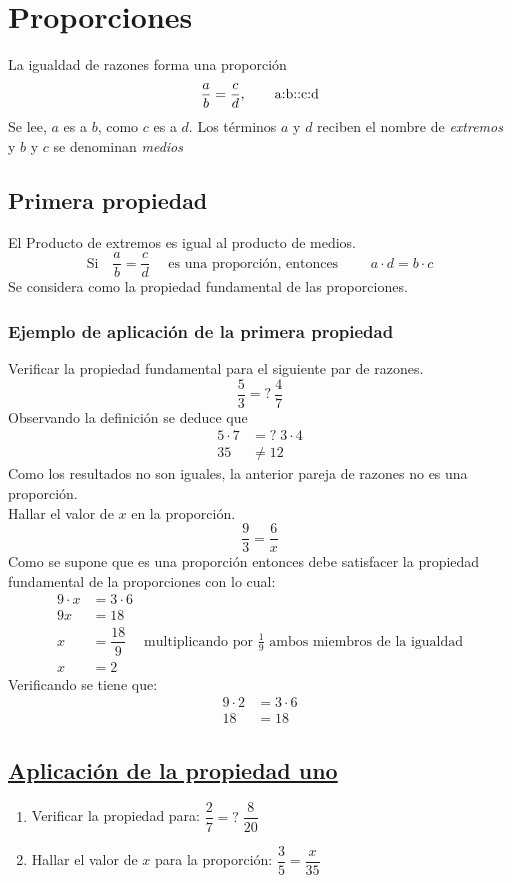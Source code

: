 \documentclass[10pt,twoside]{article}
\begin{document}
\section*{Proporciones}
La igualdad de razones forma una proporción
\[\dfrac{a}{b}=\dfrac{c}{d}, \text{\qquad a:b::c:d}\]
Se lee, $a$ es a $b$, como $c$ es a $d$. Los términos $a$ y $d$ reciben el nombre de \emph{extremos} y $b$ y $c$ se denominan \emph{medios}
\subsection*{Primera propiedad}
El Producto de extremos es igual al producto de medios.
\[\text{Si} \quad \dfrac{a}{b}=\dfrac{c}{d}\quad \text{ es una proporción, entonces }\qquad a\cdot d=b\cdot c\]
Se considera como la propiedad fundamental de las proporciones.
\subsubsection*{Ejemplo de aplicaci\'{o}n de la primera propiedad}
Verificar la propiedad fundamental para el siguiente par de razones.
\[\dfrac{5}{3}=?\: \dfrac{4}{7}\]
Observando la definición se deduce que 
\begin{align*}
5\cdot 7 &=?\; 3 \cdot 4\\
35&\neq12
\end{align*}
Como los resultados no son iguales, la anterior pareja de razones no es una proporción.\\

Hallar el valor de $x$ en la proporción.
\[\dfrac{9}{3}=\dfrac{6}{x}\]
Como se supone que es una proporci\'{o}n entonces debe satisfacer la propiedad fundamental de la proporciones con lo cual:
\begin{align*}
9\cdot x&=3\cdot 6\\
9x&=18\\
x&=\dfrac{18}{9} & \text{multiplicando por } \frac{1}{9} \text{ ambos miembros de la igualdad}\\
x&=2
\end{align*}
Verificando se tiene que:
\begin{align*}
9\cdot 2&=3\cdot 6\\
18&=18
\end{align*}
\subsection*{\underline{Aplicaci\'{o}n de la propiedad uno}}
\begin{enumerate}
\item Verificar la propiedad para: \qquad $\dfrac{2}{7}=?\; \dfrac{8}{20}$
\item Hallar el valor de $x$ para la proporción: \qquad $\dfrac{3}{5}=\dfrac{x}{35}$
\end{enumerate}
\end{document}
